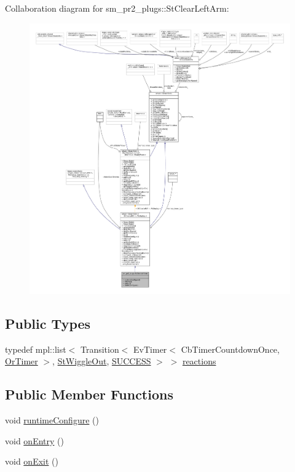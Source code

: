 Collaboration diagram for sm\+\_\+pr2\+\_\+plugs\+:\+:St\+Clear\+Left\+Arm\+:
\nopagebreak
\begin{figure}[H]
\begin{center}
\leavevmode
\includegraphics[width=350pt]{structsm__pr2__plugs_1_1StClearLeftArm__coll__graph}
\end{center}
\end{figure}
\subsection*{Public Types}
\begin{DoxyCompactItemize}
\item 
typedef mpl\+::list$<$ Transition$<$ Ev\+Timer$<$ Cb\+Timer\+Countdown\+Once, \hyperlink{classsm__pr2__plugs_1_1OrTimer}{Or\+Timer} $>$, \hyperlink{structsm__pr2__plugs_1_1StWiggleOut}{St\+Wiggle\+Out}, \hyperlink{classSUCCESS}{S\+U\+C\+C\+E\+SS} $>$ $>$ \hyperlink{structsm__pr2__plugs_1_1StClearLeftArm_ad3ce24ba9cd08d5c1ec12e041b3af125}{reactions}
\end{DoxyCompactItemize}
\subsection*{Public Member Functions}
\begin{DoxyCompactItemize}
\item 
void \hyperlink{structsm__pr2__plugs_1_1StClearLeftArm_a23696f6137f6e29e5144bafea171faaa}{runtime\+Configure} ()
\item 
void \hyperlink{structsm__pr2__plugs_1_1StClearLeftArm_a84b636cd698de3880d9eba217b2529e9}{on\+Entry} ()
\item 
void \hyperlink{structsm__pr2__plugs_1_1StClearLeftArm_af57014dda3c5d9e45396619b7669895a}{on\+Exit} ()
\end{DoxyCompactItemize}
